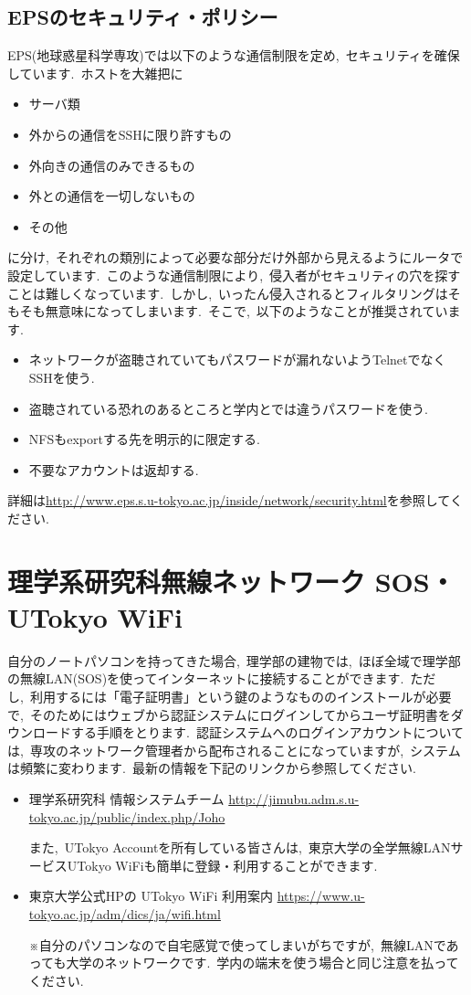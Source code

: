 \documentclass{jarticle}
\begin{document}
\subsection{EPSのセキュリティ・ポリシー}
EPS(地球惑星科学専攻)では以下のような通信制限を定め,\ セキュリティを確保しています.\  ホストを大雑把に
\begin{itemize}
\item サーバ類
\item 外からの通信をSSHに限り許すもの
\item 外向きの通信のみできるもの
\item 外との通信を一切しないもの
\item その他
\end{itemize}
に分け,\ それぞれの類別によって必要な部分だけ外部から見えるようにルータで設定しています.\ 
このような通信制限により,\ 侵入者がセキュリティの穴を探すことは難しくなっています.\ 
しかし,\ いったん侵入されるとフィルタリングはそもそも無意味になってしまいます.\ 
そこで,\ 以下のようなことが推奨されています.\ 
\begin{itemize}
\item ネットワークが盗聴されていてもパスワードが漏れないようTelnetでなくSSHを使う.\ 
\item 盗聴されている恐れのあるところと学内とでは違うパスワードを使う.\ 
\item NFSもexportする先を明示的に限定する.\ 
\item 不要なアカウントは返却する.\ 
\end{itemize}
詳細は\url{http://www.eps.s.u-tokyo.ac.jp/inside/network/security.html}を参照してください.\ 

\section{理学系研究科無線ネットワーク SOS・UTokyo WiFi}
自分のノートパソコンを持ってきた場合,\ 理学部の建物では,\ 
ほぼ全域で理学部の無線LAN(SOS)を使ってインターネットに接続することができます.\ 
ただし,\ 利用するには「電子証明書」という鍵のようなもののインストールが必要で,\ 
そのためにはウェブから認証システムにログインしてからユーザ証明書をダウンロードする手順をとります.\ 
認証システムへのログインアカウントについては,\ 専攻のネットワーク管理者から配布されることになっていますが,\ システムは頻繁に変わります.\ 最新の情報を下記のリンクから参照してください.\ 

\begin{itemize}
\item 理学系研究科 情報システムチーム
\url{http://jimubu.adm.s.u-tokyo.ac.jp/public/index.php/Joho}

また,\ UTokyo Accountを所有している皆さんは,\ 東京大学の全学無線LANサービスUTokyo WiFiも簡単に登録・利用することができます.\ 

\item 東京大学公式HPの UTokyo WiFi 利用案内
\url{https://www.u-tokyo.ac.jp/adm/dics/ja/wifi.html}
 
 ※自分のパソコンなので自宅感覚で使ってしまいがちですが,\ 無線LANであっても大学のネットワークです.\ 学内の端末を使う場合と同じ注意を払ってください.\ 
\end{itemize}
\end{document}
